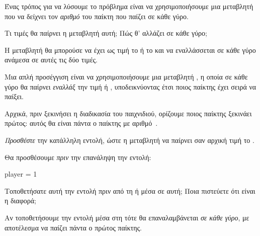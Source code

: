 \documentclass[a4paper,11pt,oneside]{book}
\begin{document}
\begin{step}
Ένας τρόπος για να λύσουμε το πρόβλημα είναι να χρησιμοποιήσουμε μια μεταβλητή  που να δείχνει τον \emph{αριθμό} του παίκτη που παίζει σε κάθε γύρο. 

Τι τιμές θα παίρνει η μεταβλητή αυτή; Πώς θ' αλλάζει σε κάθε γύρο;

\begin{answer}
Η μεταβλητή θα μπορούσε να έχει ως τιμή το  ή το  και να εναλλάσσεται σε κάθε γύρο ανάμεσα σε αυτές τις δύο τιμές.
\end{answer}

Μια απλή προσέγγιση είναι να χρησιμοποιήσουμε μια μεταβλητή , η οποία σε κάθε γύρο θα παίρνει \emph{εναλλάξ} την τιμή  ή , υποδεικνύοντας έτσι ποιος παίκτης έχει σειρά να παίξει.

Αρχικά, πριν ξεκινήσει η διαδικασία του παιχνιδιού, ορίζουμε ποιος
παίκτης ξεκινάει πρώτος: αυτός θα είναι πάντα ο παίκτης με αριθμό~.

\emph{Προσθέστε} την κατάλληλη εντολή, ώστε η μεταβλητή  να παίρνει σαν αρχική τιμή το .

\begin{answer}
Θα προσθέσουμε \emph{πριν} την επανάληψη την εντολή:

\begin{pynew}
player = 1
\end{pynew}
\end{answer}

Τοποθετήσατε αυτή την εντολή πριν από τη  ή μέσα σε αυτή; Ποια πιστεύετε ότι είναι η διαφορά;

\begin{answer}
Αν τοποθετήσουμε την εντολή μέσα στη  τότε θα επαναλαμβάνεται \emph{σε κάθε γύρο}, με αποτέλεσμα να παίζει πάντα ο πρώτος παίκτης.
\end{answer}	
\end{step}
\end{document}
